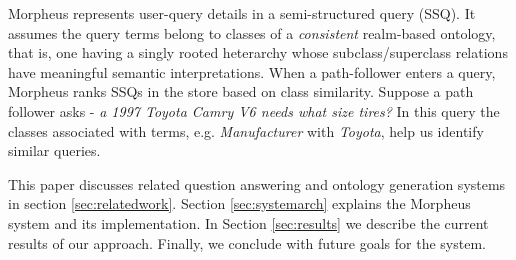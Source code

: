 Morpheus represents user-query details in a semi-structured query (SSQ). It assumes the query terms belong to classes of a \textit{consistent} realm-based ontology, that is, one having a singly rooted heterarchy whose subclass/superclass relations have meaningful semantic interpretations. When a path-follower enters a query, Morpheus ranks SSQs in the store based on class similarity. Suppose a path follower asks -\textit{ a 1997 Toyota Camry V6 needs what size tires?} In this query the classes associated with terms, e.g. \emph{Manufacturer} with \emph{Toyota}, help us identify similar queries.

This paper discusses related question answering and ontology generation systems in section \ref{sec:relatedwork}. Section \ref{sec:systemarch} explains the Morpheus system and its implementation. In Section \ref{sec:results} we describe the current results of our approach.  Finally, we conclude with future goals for the system.
